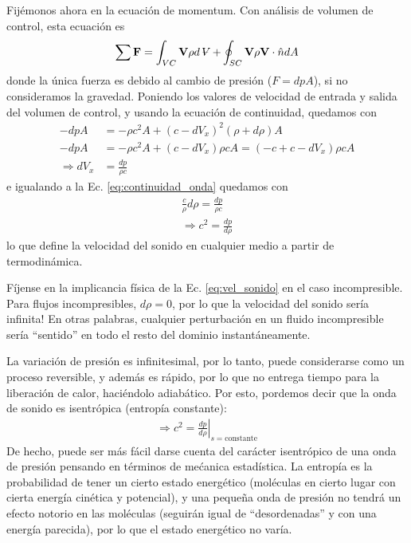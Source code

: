 Fijémonos ahora en la ecuación de momentum. 
Con análisis de volumen de control, esta ecuación es
%
\begin{equation}
\sum \mathbf{F} = \int_{VC}\mathbf{V}\rho d\vol + \oint_{SC}\mathbf{V}\rho \mathbf{V}\cdot\hat{n}dA
\end{equation}
%
donde la única fuerza es debido al cambio de presión ($F=dpA$), si no consideramos la gravedad.
Poniendo los valores de velocidad de entrada y salida del volumen de control, y usando la ecuación de continuidad, quedamos con
%
\begin{align}\label{eq:momentum_onda}
-dpA &= -\rho c^2A + (c-dV_x)^2(\rho+d\rho)A\nonumber\\
-dpA &= -\rho c^2A + (c-dV_x)\rho cA = (-c+c-dV_x)\rho cA\nonumber\\
\Rightarrow dV_x &= \frac{dp}{\rho c}
\end{align}
%
e igualando a la Ec. \eqref{eq:continuidad_onda} quedamos con
%
\begin{align}\label{eq:vel_sonido}
\frac{c}{\rho}d\rho = \frac{dp}{\rho c}\nonumber\\
\Rightarrow c^2 = \frac{dp}{d\rho}
\end{align}
%
lo que define la velocidad del sonido en cualquier medio a partir de termodinámica.

Fíjense en la implicancia física de la Ec. \eqref{eq:vel_sonido} en el caso incompresible.
Para flujos incompresibles, $d\rho=0$, por lo que la velocidad del sonido sería infinita!
En otras palabras, cualquier perturbación en un fluido incompresible sería ``sentido'' en todo el resto del dominio instantáneamente.

La variación de presión es infinitesimal, por lo tanto, puede considerarse como un proceso reversible, y además es rápido, por lo que no entrega tiempo para la liberación de calor, haciéndolo adiabático.
Por esto, pordemos decir que la onda de sonido es isentrópica (entropía constante):
%
\begin{align}\label{eq:vel_sonido}
\Rightarrow c^2 = \left.\frac{dp}{d\rho}\right|_{s=\text{constante}}
\end{align}
%
De hecho, puede ser más fácil darse cuenta del carácter isentrópico de una onda de presión pensando en términos de mećanica estadística.
La entropía es la probabilidad de tener un cierto estado energético (moléculas en cierto lugar con cierta energía cinética y potencial), y una pequeña onda de presión no tendrá un efecto notorio en las moléculas (seguirán igual de ``desordenadas'' y con una energía parecida), por lo que el estado energético no varía.

